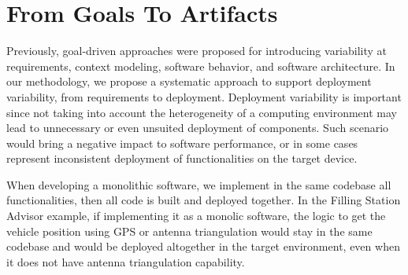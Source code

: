 \section{From Goals To Artifacts}

Previously, goal-driven  approaches were proposed for introducing variability at requirements, context modeling, software behavior, and software architecture\cite{angelopoulos_capturing_2015}\cite{yu_goals_2008}.
In our methodology, we propose a systematic approach to support deployment variability, from requirements to deployment.
Deployment variability is important since not taking into account the heterogeneity of a computing environment may lead to unnecessary or even unsuited deployment of components.
Such scenario would bring a negative impact to software performance, or in some cases represent inconsistent deployment of functionalities on the target device.


When developing a monolithic software, we implement in the same codebase all functionalities, then all code is built and deployed together.
In the Filling Station Advisor example, if implementing it as a monolic software, the logic to get the vehicle position using GPS or antenna triangulation would stay in the same codebase and would be deployed altogether in the target environment, even when it does not have antenna triangulation capability.



